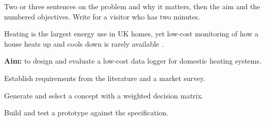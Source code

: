 \begin{guidance}
Two or three sentences on the problem and why it matters, then the aim and
the numbered objectives. Write for a visitor who has two minutes.
\end{guidance}

Heating is the largest energy use in UK homes, yet low-cost monitoring of
how a house heats up and cools down is rarely available \parencite{bausch2014}.

\textbf{Aim:} to design and evaluate a low-cost data logger for domestic
heating systems.

\begin{objectives}
  \item Establish requirements from the literature and a market survey.
  \item Generate and select a concept with a weighted decision matrix.
  \item Build and test a prototype against the specification.
\end{objectives}
